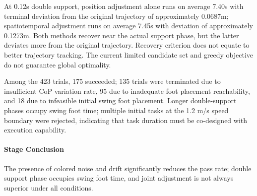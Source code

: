 
At 0.12s double support, position adjustment alone runs on average 7.40s with terminal deviation from the original trajectory of approximately 0.0687m; spatiotemporal adjustment runs on average 7.45s with deviation of approximately 0.1273m. Both methods recover near the actual support phase, but the latter deviates more from the original trajectory. Recovery criterion does not equate to better trajectory tracking. The current limited candidate set and greedy objective do not guarantee global optimality.

Among the 423 trials, 175 succeeded; 135 trials were terminated due to insufficient CoP variation rate, 95 due to inadequate foot placement reachability, and 18 due to infeasible initial swing foot placement. Longer double-support phases occupy swing foot time; multiple initial tasks at the 1.2 m/s speed boundary were rejected, indicating that task duration must be co-designed with execution capability.


\paragraph{Stage Conclusion} The presence of colored noise and drift significantly reduces the pass rate; double support phase occupies swing foot time, and joint adjustment is not always superior under all conditions.


\FloatBarrier
